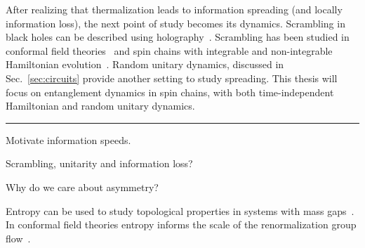 After realizing that thermalization leads to information spreading (and locally information loss), the next point of study becomes its dynamics. Scrambling in black holes can be described using holography~\cite{Sekino2008, Shenker2014}. Scrambling has been studied in conformal field theories~\cite{Calabrese2005} and spin chains with integrable and non-integrable Hamiltonian evolution~\cite{Fagotti2008, Luchli2008, Kim2013, Baradson2012}. Random unitary dynamics, discussed in Sec.~\ref{sec:circuits} provide another setting to study spreading. This thesis will focus on entanglement dynamics in spin chains, with both time-independent Hamiltonian and random unitary dynamics. 

\hrule 

Motivate information speeds.

Scrambling, unitarity and information loss?

Why do we care about asymmetry?

Entropy can be used to study topological properties in systems with mass gaps~\cite{Kitaev2006}. In conformal field theories entropy informs the scale of the renormalization group flow~\cite{Casini2011, Myers2011}.
